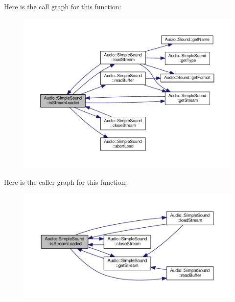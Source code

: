 Here is the call graph for this function\+:
\nopagebreak
\begin{figure}[H]
\begin{center}
\leavevmode
\includegraphics[width=350pt]{d0/d49/classAudio_1_1SimpleSound_aa3afde47046eefb4ea193aa13c24aee4_cgraph}
\end{center}
\end{figure}




Here is the caller graph for this function\+:
\nopagebreak
\begin{figure}[H]
\begin{center}
\leavevmode
\includegraphics[width=350pt]{d0/d49/classAudio_1_1SimpleSound_aa3afde47046eefb4ea193aa13c24aee4_icgraph}
\end{center}
\end{figure}


